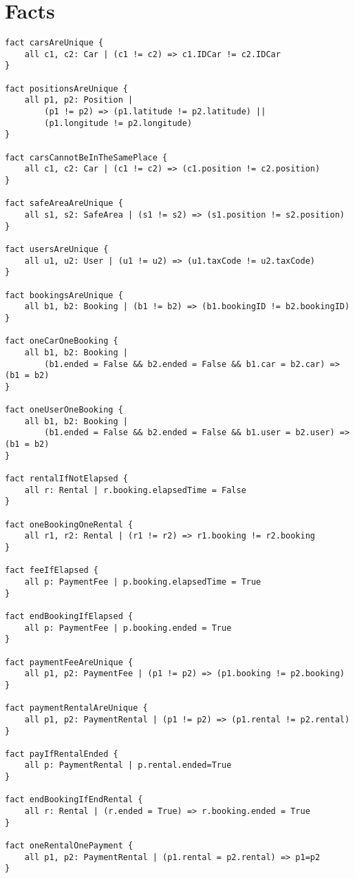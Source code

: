 \newpage

\section{Facts}

\lstset{language=alloy}

\begin{lstlisting}
fact carsAreUnique {
	all c1, c2: Car | (c1 != c2) => c1.IDCar != c2.IDCar
}

fact positionsAreUnique {
	all p1, p2: Position |
		(p1 != p2) => (p1.latitude != p2.latitude) ||
		(p1.longitude != p2.longitude)
}

fact carsCannotBeInTheSamePlace {
	all c1, c2: Car | (c1 != c2) => (c1.position != c2.position)
}

fact safeAreaAreUnique {
	all s1, s2: SafeArea | (s1 != s2) => (s1.position != s2.position)
}

fact usersAreUnique {
	all u1, u2: User | (u1 != u2) => (u1.taxCode != u2.taxCode)
}

fact bookingsAreUnique {
	all b1, b2: Booking | (b1 != b2) => (b1.bookingID != b2.bookingID)
}

fact oneCarOneBooking {
	all b1, b2: Booking |
		(b1.ended = False && b2.ended = False && b1.car = b2.car) => (b1 = b2)
}

fact oneUserOneBooking {
	all b1, b2: Booking |
		(b1.ended = False && b2.ended = False && b1.user = b2.user) => (b1 = b2)
}

fact rentalIfNotElapsed {
	all r: Rental | r.booking.elapsedTime = False
}

fact oneBookingOneRental {
	all r1, r2: Rental | (r1 != r2) => r1.booking != r2.booking
}

fact feeIfElapsed {
	all p: PaymentFee | p.booking.elapsedTime = True
}

fact endBookingIfElapsed {
	all p: PaymentFee | p.booking.ended = True
}

fact paymentFeeAreUnique {
	all p1, p2: PaymentFee | (p1 != p2) => (p1.booking != p2.booking)
}

fact paymentRentalAreUnique {
	all p1, p2: PaymentRental | (p1 != p2) => (p1.rental != p2.rental)
}

fact payIfRentalEnded {
	all p: PaymentRental | p.rental.ended=True
}

fact endBookingIfEndRental {
	all r: Rental | (r.ended = True) => r.booking.ended = True
}

fact oneRentalOnePayment {
	all p1, p2: PaymentRental | (p1.rental = p2.rental) => p1=p2
}


\end{lstlisting}
